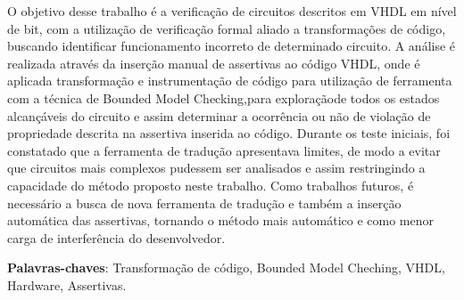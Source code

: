 O objetivo desse trabalho é a verificação de circuitos descritos em VHDL em nível de bit, com a utilização de verificação formal aliado a transformações de código, buscando identificar funcionamento incorreto de determinado circuito. A análise é realizada através da inserção manual de assertivas ao código VHDL, onde é aplicada transformação e instrumentação de código para utilização de ferramenta com a técnica de Bounded Model Checking,para exploraçãode todos os estados alcançáveis do circuito e assim determinar a ocorrência ou não de violação de propriedade descrita na assertiva inserida ao código. Durante os teste iniciais, foi constatado que a ferramenta de tradução apresentava limites, de modo a evitar que circuitos mais complexos pudessem ser analisados e assim restringindo a capacidade do método proposto neste trabalho. Como trabalhos futuros, é necessário a busca de nova ferramenta de tradução e também a inserção automática das assertivas, tornando o método mais automático e como menor carga de interferência do desenvolvedor.
\vspace{\onelineskip}
\noindent
\par
\textbf{Palavras-chaves}: Transformação de código, Bounded Model Cheching, VHDL, Hardware, Assertivas.